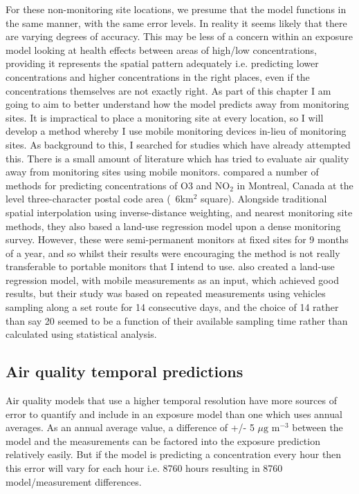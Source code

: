 For these non-monitoring site locations, we presume that the model functions in the same manner, with the same error levels. In reality it seems likely that there are varying degrees of accuracy. This may be less of a concern within an exposure model looking at health effects between areas of high/low concentrations, providing it represents the spatial pattern adequately i.e. predicting lower concentrations and higher concentrations in the right places, even if the concentrations themselves are not exactly right. As part of this chapter I am going to aim to better understand how the model predicts away from monitoring sites. It is impractical to place a monitoring site at every location, so I will develop a method whereby I use mobile monitoring devices in-lieu of monitoring sites. As background to this, I searched for studies which have already attempted this. There is a small amount of literature which has tried to evaluate air quality away from monitoring sites using mobile monitors. \cite{Buteau2017} compared a number of methods for predicting concentrations of O3 and NO$_{2}$ in Montreal, Canada at the level three-character postal code area (~6km$^{2}$ square). Alongside traditional spatial interpolation using inverse-distance weighting, and nearest monitoring site methods, they also based a land-use regression model upon a dense monitoring survey. However, these were semi-permanent monitors at fixed sites for 9 months of a year, and so whilst their results were encouraging the method is not really transferable to portable monitors that I intend to use. \cite{Shi2016} also created a land-use regression model, with mobile measurements as an input, which achieved good results, but their study was based on repeated measurements using vehicles sampling along a set route for 14 consecutive days, and the choice of 14 rather than say 20 seemed to be a function of their available sampling time rather than calculated using statistical analysis.

\subsection{Air quality temporal predictions}
\label{air_quality_temporal_predictions}

Air quality models that use a higher temporal resolution have more sources of error to quantify and include in an exposure model than one which uses annual averages. As an annual average value, a difference of +/- 5 $\mu \text{g m}^{-3}$ between the model and the measurements can be factored into the exposure prediction relatively easily. But if the model is predicting a concentration every hour then this error will vary for each hour i.e. 8760 hours resulting in 8760 model/measurement differences.

